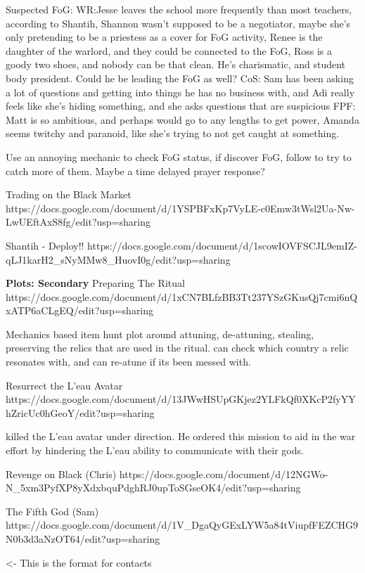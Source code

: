 \documentclass[char]{GL2020}
\begin{document}
Suspected FoG:
WR:Jesse leaves the school more frequently than most teachers, according to Shantih, Shannon wasn't supposed to be a negotiator, maybe she's only pretending to be a priestess as a cover for FoG activity, Renee is the daughter of the warlord, and they could be connected to the FoG, Ross is a goody two shoes, and nobody can be that clean.  He's charismatic, and student body president.  Could he be leading the FoG as well?
CoS: Sam has been asking a lot of questions and getting into things he has no business with, and Adi really feels like she's hiding something, and she asks questions that are suspicious
FPF: Matt is so ambitious, and perhaps would go to any lengths to get power, Amanda seems twitchy and paranoid, like she's trying to not get caught at something.

Use an annoying mechanic to check FoG status, if discover FoG, follow to try to catch more of them.  Maybe a time delayed prayer response?

Trading on the Black Market
https://docs.google.com/document/d/1YSPBFxKp7VyLE-c0Emw3tWsl2Ua-Nw-LwUEftAxS8fg/edit?usp=sharing

Shantih - Deploy!!
https://docs.google.com/document/d/1scowIOVFSCJL9emIZ-qLJ1karH2_sNyMMw8_HuovI0g/edit?usp=sharing

\textbf{Plots: Secondary}
Preparing The Ritual 
https://docs.google.com/document/d/1xCN7BLfzBB3Tt237YSzGKusQj7cmi6nQxATP6aCLgEQ/edit?usp=sharing

Mechanics based item hunt plot around attuning, de-attuning, stealing, preserving the relics that are used in the ritual. \cAntiChup{} can check which country a relic resonates with, and can re-atune if its been messed with.

Resurrect the L'eau Avatar
https://docs.google.com/document/d/13JWwHSUpGKjez2YLFkQf0XKcP2fyYYhZricUc0hGeoY/edit?usp=sharing

\cScholarship{} killed the L'eau avatar under \cAntiChup{} direction. He ordered this mission to aid in the war effort by hindering the L'eau ability to communicate with their gods.

Revenge on Black (Chris)
https://docs.google.com/document/d/12NGWo-N_5xm3PyfXP8yXdxbquPdghRJ0upToSGseOK4/edit?usp=sharing

The Fifth God (Sam)
https://docs.google.com/document/d/1V_DgaQyGExLYW5a84tViupfFEZCHG9N0b3d3aNzOT64/edit?usp=sharing



\begin{itemz}[Goals]
	\item 
\end{itemz}

\begin{itemz}[Notes]
	\item 
\end{itemz}

\begin{contacts}
	\contact{\cTest{}} <- This is the format for contacts 
\end{contacts}
\end{document}
